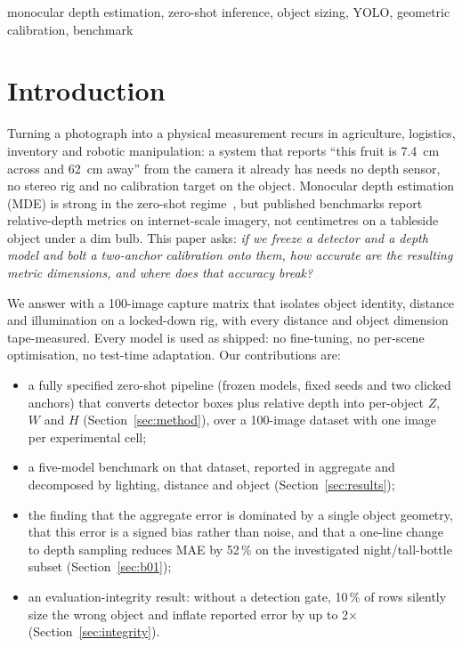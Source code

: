 \documentclass[conference]{IEEEtran}
\begin{document}
\begin{IEEEkeywords}
monocular depth estimation, zero-shot inference, object sizing, YOLO,
geometric calibration, benchmark
\end{IEEEkeywords}

\section{Introduction}
Turning a photograph into a physical measurement recurs in agriculture,
logistics, inventory and robotic manipulation: a system that reports ``this fruit
is 7.4~cm across and 62~cm away'' from the camera it already has needs no depth
sensor, no stereo rig and no calibration target on the object. Monocular depth
estimation (MDE) is strong in the zero-shot regime~\cite{ranftl2022midas,yang2024dav2},
but published benchmarks report relative-depth metrics on internet-scale imagery,
not centimetres on a tableside object under a dim bulb. This paper asks: \emph{if
we freeze a detector and a depth model and bolt a two-anchor calibration onto
them, how accurate are the resulting metric dimensions, and where does that
accuracy break?}

We answer with a 100-image capture matrix that isolates object identity, distance
and illumination on a locked-down rig, with every distance and object dimension
tape-measured. Every model is used as shipped: no fine-tuning, no per-scene
optimisation, no test-time adaptation. Our contributions are:

\begin{itemize}
\item a fully specified zero-shot pipeline (frozen models, fixed seeds and two
clicked anchors) that converts detector boxes plus
relative depth into per-object $Z$, $W$ and $H$ (Section~\ref{sec:method}), over
a 100-image dataset with one image per experimental cell;
\item a five-model benchmark on that dataset, reported in aggregate and
decomposed by lighting, distance and object (Section~\ref{sec:results});
\item the finding that the aggregate error is dominated by a single object
geometry, that this error is a signed bias rather than noise, and that a
one-line change to depth sampling reduces MAE by 52\,\% on the investigated
night/tall-bottle subset (Section~\ref{sec:b01});
\item an evaluation-integrity result: without a detection gate, 10\,\% of rows
silently size the wrong object and inflate reported error by up to
2$\times$ (Section~\ref{sec:integrity}).
\end{itemize}
\end{document}

